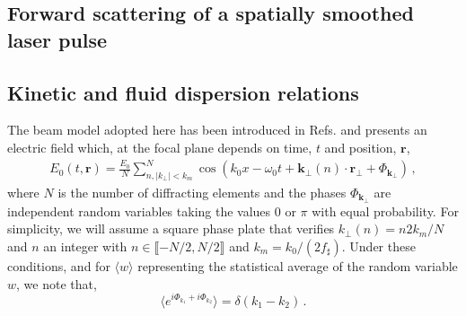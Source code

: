 \documentclass[
 reprint,
 amsmath,amssymb,
 aps,
]{revtex4-1}
\begin{document}
 \begin{widetext}
\section{Forward scattering of a spatially smoothed laser pulse}
\subsection{Kinetic and fluid dispersion relations}\label{sec:diperpp}
The  beam model adopted here has been introduced in  Refs. \cite[]{POF_Schmitt_88,POF_Rose_93} and presents an electric field which,  at the focal plane depends on time, $t$ and position, $ \mathbf{r}$,
 \begin{align}
E_0(t,\mathbf{r})  = \frac{E_0}{N} \sum_{n,\vert k_{\perp}\vert<k_m }^N  \cos(k_0x - \omega_0t +\mathbf{k}_\perp(n) \cdot \mathbf{r}_\perp +\Phi_{\mathbf{k}_\perp})\, , \label{eq:erpp}
 \end{align}
 where  $N$ is the number of diffracting elements and the phases $\Phi_{\mathbf{k}_\perp}$ are  independent random variables taking the values $0$ or $\pi$ with equal probability.
 For simplicity, we will assume a square phase plate that verifies $k_{\perp}(n) = n2k_m/N$ and  $n$ an integer with $n\in \llbracket - N/2 ,N/2 \rrbracket$ and $k_m = k_0/(2f_\sharp)$. 
 Under these conditions, and for $\langle w\rangle$ representing the statistical average of the random variable $w$,  we note   that,
 \begin{equation}\label{eq:d}
 \langle e^{i\Phi_{k_1}+i\Phi_{k_2}}\rangle=\delta(k_1-k_2) \, .
 \end{equation}


\end{widetext}
\end{document}
